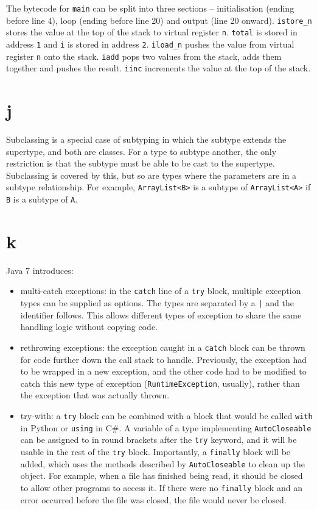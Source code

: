 \documentclass[11pt]{article}
\begin{document}
The bytecode for \texttt{main} can be split into three sections -- initialisation (ending before line 4), loop (ending before line 20) and output (line 20 onward). \texttt{istore\_n} stores the value at the top of the stack to virtual register \texttt{n}. \texttt{total} is stored in address \texttt 1 and \texttt i is stored in address \texttt 2. \texttt{iload\_n} pushes the value from virtual register \texttt n onto the stack. \texttt{iadd} pops two values from the stack, adds them together and pushes the result. \texttt{iinc} increments the value at the top of the stack.

\section*{j}
Subclassing is a special case of subtyping in which the subtype extends the supertype, and both are classes. For a type to subtype another, the only restriction is that the subtype must be able to be cast to the supertype. Subclassing is covered by this, but so are types where the parameters are in a subtype relationship. For example, \texttt{ArrayList<B>} is a subtype of \texttt{ArrayList<A>} if \texttt B is a subtype of \texttt A.

\section*{k}
Java 7 introduces:
\begin{itemize}
  \item multi-catch exceptions: in the \texttt{catch} line of a \texttt{try} block, multiple exception types can be supplied as options. The types are separated by a \texttt| and the identifier follows. This allows different types of exception to share the same handling logic without copying code.
  \item rethrowing exceptions: the exception caught in a \texttt{catch} block can be thrown for code further down the call stack to handle. Previously, the exception had to be wrapped in a new exception, and the other code had to be modified to catch this new type of exception (\texttt{RuntimeException}, usually), rather than the exception that was actually thrown.
  \item try-with: a \texttt{try} block can be combined with a block that would be called \texttt{with} in Python or \texttt{using} in C\#. A variable of a type implementing \texttt{AutoCloseable} can be assigned to in round brackets after the \texttt{try} keyword, and it will be usable in the rest of the \texttt{try} block. Importantly, a \texttt{finally} block will be added, which uses the methods described by \texttt{AutoCloseable} to clean up the object. For example, when a file has finished being read, it should be closed to allow other programs to access it. If there were no \texttt{finally} block and an error occurred before the file was closed, the file would never be closed.
\end{itemize}
\end{document}
